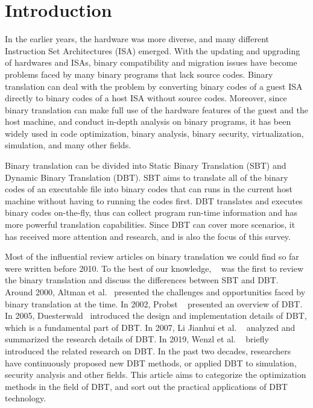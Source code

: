 \section{Introduction}

In the earlier years, the hardware was more diverse, and many different Instruction Set Architectures (ISA) emerged.
With the updating and upgrading of hardwares and ISAs, binary compatibility and migration issues have become problems faced by many binary programs that lack source codes.
Binary translation can deal with the problem by converting binary codes of a guest ISA directly to binary codes of a host ISA without source codes.
Moreover, since binary translation can make full use of the hardware features of the guest and the host machine, and conduct in-depth analysis on binary programs, it has been widely used in code optimization, binary analysis, binary security, virtualization, simulation, and many other fields. 

Binary translation can be divided into Static Binary Translation (SBT) and Dynamic Binary Translation (DBT).
SBT aims to translate all of the binary codes of an executable file into binary codes that can runs in the current host machine without having to running the codes first.
DBT translates and executes binary codes on-the-fly, thus can collect program run-time information and has more powerful translation capabilities.
Since DBT can cover more scenarios, it has received more attention and research, and is also the focus of this survey.

Most of the influential review articles on binary translation we could find so far were written before 2010.
To the best of our knowledge, ~\cite{DBLP:conf/icsm/CifuentesM96} was the first to review the binary translation and discuss the differences between SBT and DBT.
Around 2000, Altman et al.~\cite{DBLP:journals/pieee/AltmanEGS01}\cite{DBLP:journals/computer/AltmanKS00} presented the challenges and opportunities faced by binary translation at the time.
In 2002, Probst ~\cite{probst2002dynamic} presented an overview of DBT.
In 2005, Duesterwald~\cite{DBLP:journals/pieee/Duesterwald05} introduced the design and implementation details of DBT, which is a fundamental part of DBT.
In 2007, Li Jianhui et al. ~\cite{Li2007} analyzed and summarized the research details of DBT.
In 2019, Wenzl et al. ~\cite{DBLP:journals/csur/WenzlMUW19} briefly introduced the related research on DBT.
In the past two decades, researchers have continuously proposed new DBT methods, or applied DBT to simulation, security analysis and other fields.
This article aims to categorize the optimization methods in the field of DBT, and sort out the practical applications of DBT technology.

